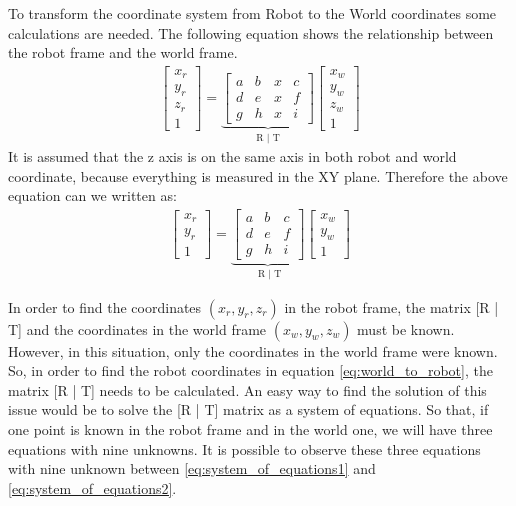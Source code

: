 To transform the coordinate system from Robot to the World coordinates some calculations are needed. The following equation shows the relationship between the robot frame and the world frame.
\begin{align*}
\begin{bmatrix}
x_r \\
y_r \\
z_r \\
1 
\end{bmatrix}
= \underbrace{\begin{bmatrix}
a & b & x & c \\
d & e & x & f \\
g & h & x & i 
\end{bmatrix}}_{\text{R | T}}
\begin{bmatrix}
x_w \\
y_w \\
z_w\\
1 
\end{bmatrix}
\end{align*}
It is assumed that the z axis is on the same axis in both robot and world coordinate, because everything is measured in the XY plane. Therefore the above equation can we written as: 
\begin{align}
\begin{bmatrix}
x_r \\
y_r \\
1 
\end{bmatrix}
= \underbrace{\begin{bmatrix}
a & b & c \\
d & e & f \\
g & h & i 
\end{bmatrix}}_{\text{    R   | T}}
\begin{bmatrix}
x_w \\
y_w \\
1 
\end{bmatrix}
\label{eq:world_to_robot}
\end{align}

In order to find the coordinates $(x_r,y_r,z_r)$ in the robot frame, the matrix [R | T] and the coordinates in the world frame $(x_w,y_w,z_w)$ must be known. However, in this situation, only  the coordinates in the world frame were known. So, in order to find the robot coordinates in equation \ref{eq:world_to_robot}, the matrix [R | T] needs to be calculated. An easy way to find the solution of this issue would be to solve the [R | T] matrix as a system of equations. So that, if one point is known in the robot frame and in the world one, we will have three equations with nine unknowns. It is possible to observe these three equations with nine unknown between \ref{eq:system_of_equations1} and \ref{eq:system_of_equations2}.
 
